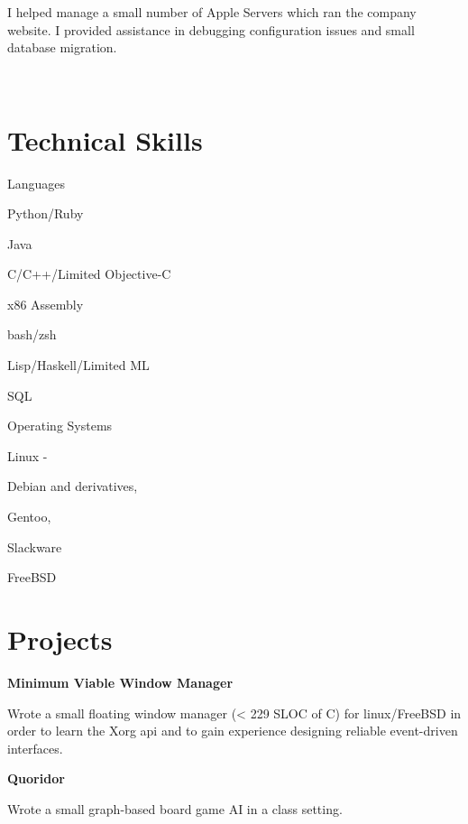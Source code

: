 \documentclass[letter,margin,line]{resume}
\begin{document}
\begin{resume}
\begin{asparadesc}
		\small
		I helped manage a small number of Apple Servers which ran the company website.
		I provided assistance in debugging configuration issues and small database migration.
		
		\normalsize
		\\
	\end{asparadesc}

\section{\mysidestyle Technical Skills}
	\begin{compactdesc}
		\item[Languages] \begin{inparaenum} { \small
			\item Python/Ruby
			\item Java
			\item C/C++/Limited Objective-C
			\item x86 Assembly
			\item bash/zsh
			\item Lisp/Haskell/Limited ML
			\item SQL
		} \end{inparaenum}
		\item[Operating Systems] \begin{inparaenum} { \small
			\item Linux -
			\begin{inparablank}
				\item Debian and derivatives,
				\item Gentoo,
				\item Slackware
			\end{inparablank}
			\item FreeBSD
		} \end{inparaenum}
	\end{compactdesc}
	
\section{\mysidestyle Projects}
	\begin{asparablank}
		\item {\bf Minimum Viable Window Manager}
		
		\small Wrote a small floating window manager (< 229 SLOC of C) for linux/FreeBSD in order to learn the Xorg api and to gain experience designing reliable event-driven interfaces. 
		\normalsize
		\\
		
		\item {\bf Quoridor}
		
		\small Wrote a small graph-based board game AI in a class setting.
		\normalsize
		\\
	\end{asparablank}	
\end{resume}
\end{document}
